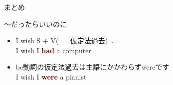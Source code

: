\documentclass[aspectratio=169,xcolor={dvipsnames,table}]{beamer}
\begin{document}
\begin{frame}[plain]{まとめ}
 
\begin{block}{～だったらいいのに}
\small
\begin{itemize}[square]
 \item I wish S $+$ V($=$ {\scriptsize 仮定法過去}) \ldots .\\
\hspace*{40pt}I wish I \textcolor{Maroon}{\bfseries had} a computer.
 \item be動詞の仮定法過去は主語にかかわらずwereです\\
\hspace*{40pt}I wish I \textcolor{Maroon}{\bfseries were} a pianist
\end{itemize}
\end{block}



\end{frame}
\end{document}

